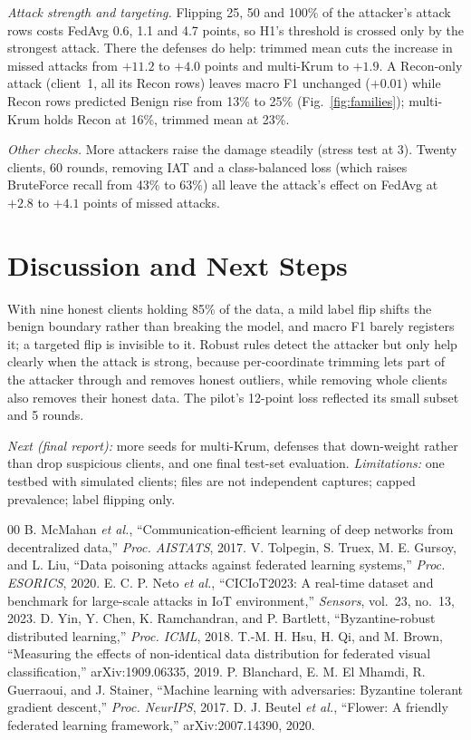 \documentclass[journal]{IEEEtran}
\begin{document}
\emph{Attack strength and targeting.} Flipping 25, 50 and 100\% of the attacker's attack rows costs FedAvg 0.6, 1.1 and 4.7 points, so H1's threshold is crossed only by the strongest attack. There the defenses do help: trimmed mean cuts the increase in missed attacks from $+11.2$ to $+4.0$ points and multi-Krum to $+1.9$. A Recon-only attack (client~1, all its Recon rows) leaves macro F1 unchanged ($+0.01$) while Recon rows predicted Benign rise from 13\% to 25\% (Fig.~\ref{fig:families}); multi-Krum holds Recon at 16\%, trimmed mean at 23\%.

\emph{Other checks.} More attackers raise the damage steadily (stress test at 3). Twenty clients, 60 rounds, removing IAT and a class-balanced loss (which raises BruteForce recall from 43\% to 63\%) all leave the attack's effect on FedAvg at $+2.8$ to $+4.1$ points of missed attacks.

\section{Discussion and Next Steps}
With nine honest clients holding 85\% of the data, a mild label flip shifts the benign boundary rather than breaking the model, and macro F1 barely registers it; a targeted flip is invisible to it. Robust rules detect the attacker but only help clearly when the attack is strong, because per-coordinate trimming lets part of the attacker through and removes honest outliers, while removing whole clients also removes their honest data. The pilot's 12-point loss reflected its small subset and 5 rounds.

\emph{Next (final report):} more seeds for multi-Krum, defenses that down-weight rather than drop suspicious clients, and one final test-set evaluation. \emph{Limitations:} one testbed with simulated clients; files are not independent captures; capped prevalence; label flipping only.

\begin{thebibliography}{00}
\itemsep 0pt
 B. McMahan \emph{et al.}, ``Communication-efficient learning of deep networks from decentralized data,'' \emph{Proc. AISTATS}, 2017.
 V. Tolpegin, S. Truex, M. E. Gursoy, and L. Liu, ``Data poisoning attacks against federated learning systems,'' \emph{Proc. ESORICS}, 2020.
 E. C. P. Neto \emph{et al.}, ``CICIoT2023: A real-time dataset and benchmark for large-scale attacks in IoT environment,'' \emph{Sensors}, vol.~23, no.~13, 2023.
 D. Yin, Y. Chen, K. Ramchandran, and P. Bartlett, ``Byzantine-robust distributed learning,'' \emph{Proc. ICML}, 2018.
 T.-M. H. Hsu, H. Qi, and M. Brown, ``Measuring the effects of non-identical data distribution for federated visual classification,'' arXiv:1909.06335, 2019.
 P. Blanchard, E. M. El Mhamdi, R. Guerraoui, and J. Stainer, ``Machine learning with adversaries: Byzantine tolerant gradient descent,'' \emph{Proc. NeurIPS}, 2017.
 D. J. Beutel \emph{et al.}, ``Flower: A friendly federated learning framework,'' arXiv:2007.14390, 2020.
\end{thebibliography}
\end{document}
